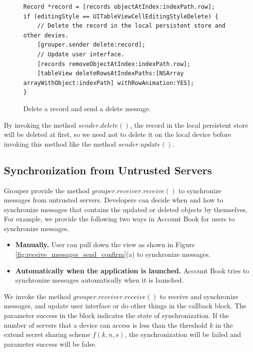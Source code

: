 \documentclass[a4paper,11pt]{report}
\begin{document}
\begin{figure}
\begin{lstlisting}[frame=none language=Objective-C] 
Record *record = [records objectAtIndex:indexPath.row];
if (editingStyle == UITableViewCellEditingStyleDelete) {
    // Delete the record in the local persistent store and other devies.
    [grouper.sender delete:record];
    // Update user interface.
    [records removeObjectAtIndex:indexPath.row];
    [tableView deleteRowsAtIndexPaths:[NSArray arrayWithObject:indexPath] withRowAnimation:YES];
}
\end{lstlisting}
\caption{Delete a record and send a delete message.}
\label{fig:delete_record}
\end{figure}

By invoking the method $sender.delete()$, the record in the local persistent store will be deleted at first, so we need not to delete it on the local device before invoking this method like the method $sender.update()$.

\subsection{Synchronization from Untrusted Servers}

Grouper provide the method $grouper.receiver.receive()$ to synchronize messages from untrusted servers.
Developers can decide when and how to synchronize messages that contains the updated or deleted objects by themselves.
For example, we provide the following two ways in Account Book for users to synchronize messages.

\begin{itemize}[leftmargin=7mm]
	\setlength{\itemsep}{1pt}
	\setlength{\parskip}{0pt}
	\setlength{\parsep}{0pt}
	\item \textbf{Manually.}
	User can pull down the view as shown in Figure \ref{fig:receive_messages_send_confirm}(a) to synchronize messages.
	\item \textbf{Automatically when the application is launched.} 
	Account Book tries to synchronize messages automatically when it is launched.
\end{itemize}

We invoke the method $grouper.receiver.receive()$ to receive and synchronize messages, and update user interface or do other things in the callback block.
The parameter success in the block indicates the state of synchronization.
If the number of servers that a device can access is less than the threshold $k$ in the extend secret sharing scheme $f(k, n, s)$, the synchronization will be failed and parameter success will be false.
\end{document}
